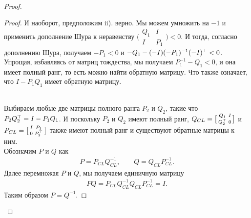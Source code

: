 \begin{proof}
\begin{proof}
		И наоборот, предположим ii). верно. Мы можем умножить на $-1$ и применить дополнение Шура к неравенству 
		$\bigl( \begin{smallmatrix} 
			{Q}_{1} & I \\ 
			I & {P}_{1}\end{smallmatrix} \bigr) <0$. 
		И тогда, согласно дополнению Шура, получаем $-{P}_{1}<0$ и $-{Q}_{1}-(-{I})(-{P}_{1})^{-1}(-{I})^\top<0$. Упрощая, избавляясь от матриц тождества, мы получаем ${P}_{1}^{-1}-{Q}_{1}<0$, и она имеет полный ранг, то есть можно найти обратную матрицу. Что также означает, что ${I}-{P}_{1}{Q}_{1}$ имеет обратную матрицу.\\\
		
		Выбираем любые две матрицы полного ранга ${P}_{2}$ и ${Q}_{2}$, такие что ${P}_{2}{Q}_{2}^\top={I}-{P}_{1}{Q}_{1}$. И поскольку ${P}_2$ и ${Q}_2$ имеют полный ранг, ${Q}_{CL}=\bigl[\begin{smallmatrix}  
			{Q}_{1} & {I}\\
			{Q}_{2}^\top & 0
		\end{smallmatrix} \bigr]$ и 
		${P}_{CL}=\bigl[ \begin{smallmatrix}
			{I} & {P}_{1} \\
			0 & {P}_{2}^\top
		\end{smallmatrix} \bigr]$ также имеют полный ранг и существуют обратные матрицы к ним.\\
		
		Обозначим ${P}$ и ${Q}$ как 
		\begin{align*}
			{P} = {P}_{CL}{Q}_{CL}^{-1}, \qquad {Q} ={Q}_{CL}{P}_{CL}^{-1}.
		\end{align*} 
		Далее перемножая ${P}$ и ${Q}$, мы получаем единичную матрицу
		\begin{align*}
			{P}{Q}={P}_{CL}{Q}_{CL}^{-1}{Q}_{CL}{P}_{CL}^{-1}={I}.
		\end{align*}
		Таким образом ${P}={Q}^{-1}$.
		

\end{proof}
\end{proof}
